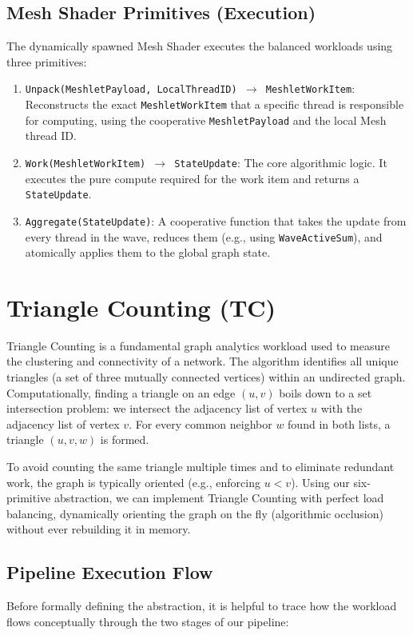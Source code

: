 \documentclass[11pt, a4paper]{article}
\begin{document}
\subsection{Mesh Shader Primitives (Execution)}
The dynamically spawned Mesh Shader executes the balanced workloads using three primitives:
\begin{enumerate}
    \item \texttt{Unpack(MeshletPayload, LocalThreadID) $\rightarrow$ MeshletWorkItem}: Reconstructs the exact \texttt{MeshletWorkItem} that a specific thread is responsible for computing, using the cooperative \texttt{MeshletPayload} and the local Mesh thread ID.
    \item \texttt{Work(MeshletWorkItem) $\rightarrow$ StateUpdate}: The core algorithmic logic. It executes the pure compute required for the work item and returns a \texttt{StateUpdate}.
    \item \texttt{Aggregate(StateUpdate)}: A cooperative function that takes the update from every thread in the wave, reduces them (e.g., using \texttt{WaveActiveSum}), and atomically applies them to the global graph state.
\end{enumerate}

\section{Triangle Counting (TC)}

Triangle Counting is a fundamental graph analytics workload used to measure the clustering and connectivity of a network. The algorithm identifies all unique triangles (a set of three mutually connected vertices) within an undirected graph. Computationally, finding a triangle on an edge $(u, v)$ boils down to a set intersection problem: we intersect the adjacency list of vertex $u$ with the adjacency list of vertex $v$. For every common neighbor $w$ found in both lists, a triangle $(u, v, w)$ is formed.

To avoid counting the same triangle multiple times and to eliminate redundant work, the graph is typically oriented (e.g., enforcing $u < v$). Using our six-primitive abstraction, we can implement Triangle Counting with perfect load balancing, dynamically orienting the graph on the fly (algorithmic occlusion) without ever rebuilding it in memory.

\subsection{Pipeline Execution Flow}
Before formally defining the abstraction, it is helpful to trace how the workload flows conceptually through the two stages of our pipeline:
\end{document}
